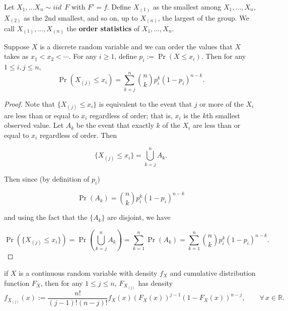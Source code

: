 \begin{definition} Let \(X_1, \ldots X_n \sim iid \ \ F\) with \(F' = f\). Define \(X_{(1)}\) as the smallest among \(X_1, \ldots, X_n\), \(X_{(2)}\) as the 2nd smallest, and so on, up to \(X_{(n)}\), the largest of the group. We call \(X_{(1)}, \ldots, X_{(n)}\) the \textbf{order statistics} of \(X_1, \ldots, X_n\).

\end{definition}

\begin{proposition}\label{mathstats.order.stats.dist} Suppose $X$ is a discrete random variable and we can order the values that $X$ takes as $x_{1}<x_{2}<\cdots$.  For any $i\geq1$, define $p_{i}:= \Pr(X\leq x_{i})$. Then for any $1\leq i,j\leq n$,
$$\Pr(X_{(j)}\leq x_{i})=\sum_{k=j}^{n}\binom{n}{k}p_{i}^{k}(1-p_{i})^{n-k}.$$
\end{proposition}

\begin{proof} Note that \(\{X_{(j)} \leq x_i\}\) is equivalent to the event that \(j\) or more of the \(X_i\) are less than or equal to \(x_i\) regardless of order; that is, \(x_i\) is the \(k\)th smallest observed value. Let \(A_k\) be the event that exactly \(k\) of the \(X_i\) are less than or equal to \(x_i\) regardless of order. Then

\[
\{X_{(j)} \leq x_i\} = \bigcup_{k=j}^n A_k.
\]

Then since (by definition of \(p_i\))

\[
\Pr(A_k) = \binom{n}{k} p_i^k(1-p_i)^{n-k}
\]

and using the fact that the \(\{A_k\}\) are disjoint, we have

\[
\Pr(\{X_{(j)} \leq x_i\}) = \Pr(\bigcup_{k=j}^n A_k) = \sum_{k=1}^n \Pr(A_k) = \sum_{k=1}^n \binom{n}{k} p_i^k(1-p_i)^{n-k}.
\]

\end{proof}

\begin{corollary}\label{mathstats.order.stats.density.541a} if $X$ is a continuous random variable with density $f_{X}$ and cumulative distribution function $F_{X}$, then for any $1\leq j\leq n$, $F_{X_{(j)}}$ has density
$$f_{X_{(j)}}(x):=\frac{n!}{(j-1)!(n-j)!}f_{X}(x)(F_{X}(x))^{j-1}(1-F_{X}(x))^{n-j},\qquad\forall\,x\in\mathbb{R}.$$

\end{corollary}

